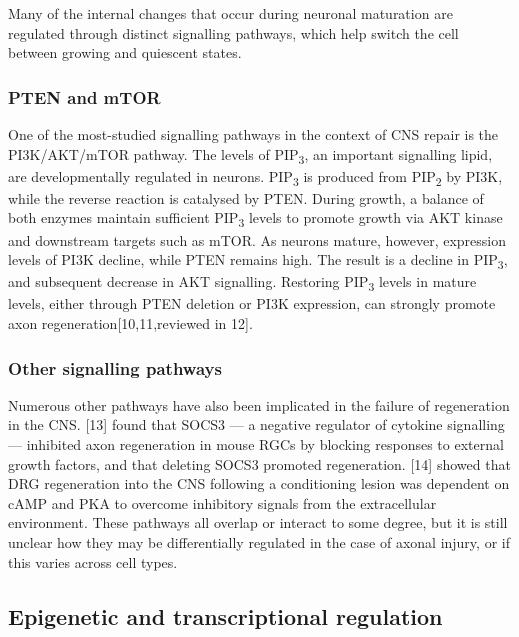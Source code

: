 \documentclass[
  12pt,
  a4paper,
]{book}
\begin{document}
Many of the internal changes that occur during neuronal maturation are regulated through distinct signalling pathways, which help switch the cell between growing and quiescent states.

\hypertarget{pten-and-mtor}{%
\subsubsection{PTEN and mTOR}\label{pten-and-mtor}}

One of the most-studied signalling pathways in the context of CNS repair is the PI3K/AKT/mTOR pathway. The levels of PIP\textsubscript{3}, an important signalling lipid, are developmentally regulated in neurons. PIP\textsubscript{3} is produced from PIP\textsubscript{2} by PI3K, while the reverse reaction is catalysed by PTEN. During growth, a balance of both enzymes maintain sufficient PIP\textsubscript{3} levels to promote growth via AKT kinase and downstream targets such as mTOR. As neurons mature, however, expression levels of PI3K decline, while PTEN remains high. The result is a decline in PIP\textsubscript{3}, and subsequent decrease in AKT signalling. Restoring PIP\textsubscript{3} levels in mature levels, either through PTEN deletion or PI3K expression, can strongly promote axon regeneration{[}10,11,reviewed in 12{]}.

\hypertarget{other-signalling-pathways}{%
\subsubsection{Other signalling pathways}\label{other-signalling-pathways}}

Numerous other pathways have also been implicated in the failure of regeneration in the CNS. {[}13{]} found that SOCS3 --- a negative regulator of cytokine signalling --- inhibited axon regeneration in mouse RGCs by blocking responses to external growth factors, and that deleting SOCS3 promoted regeneration. {[}14{]} showed that DRG regeneration into the CNS following a conditioning lesion was dependent on cAMP and PKA to overcome inhibitory signals from the extracellular environment. These pathways all overlap or interact to some degree, but it is still unclear how they may be differentially regulated in the case of axonal injury, or if this varies across cell types.

\hypertarget{epigenetic-and-transcriptional-regulation}{%
\subsection{Epigenetic and transcriptional regulation}\label{epigenetic-and-transcriptional-regulation}}
\end{document}
